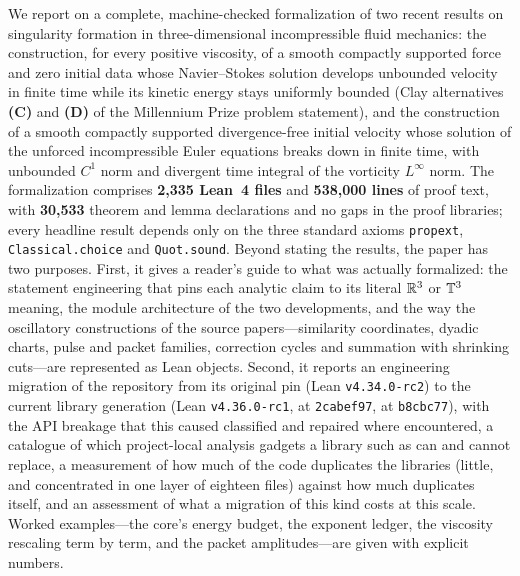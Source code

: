 We report on a complete, machine-checked formalization of two recent results on
singularity formation in three-dimensional incompressible fluid mechanics: the
construction, for every positive viscosity, of a smooth compactly supported force and
zero initial data whose Navier--Stokes solution develops unbounded velocity in finite
time while its kinetic energy stays uniformly bounded (Clay alternatives \textbf{(C)}
and \textbf{(D)} of the Millennium Prize problem statement), and the construction of a
smooth compactly supported divergence-free initial velocity whose solution of the
unforced incompressible Euler equations breaks down in finite time, with unbounded
$C^1$ norm and divergent time integral of the vorticity $L^\infty$ norm. The
formalization comprises \textbf{2{,}335 Lean~4 files} and \textbf{538{,}000 lines} of
proof text, with \textbf{30{,}533} theorem and lemma declarations and no gaps in the
proof libraries; every headline result depends only on the three standard axioms
\texttt{propext}, \texttt{Classical.choice} and \texttt{Quot.sound}. Beyond stating the
results, the paper has two purposes. First, it gives a reader's guide to what was
actually formalized: the statement engineering that pins each analytic claim to its
literal $\mathbb{R}^3$ or $\mathbb{T}^3$ meaning, the module architecture of the two developments, and
the way the oscillatory constructions of the source papers---similarity coordinates,
dyadic charts, pulse and packet families, correction cycles and summation with
shrinking cuts---are represented as Lean objects. Second, it reports an engineering
migration of the repository from its original pin (Lean \texttt{v4.34.0-rc2}) to the
current library generation (Lean \texttt{v4.36.0-rc1}, \Mathlib{} at \texttt{2cabef97},
\TauCeti{} at \texttt{b8cbc77}), with the API breakage that this caused classified and
repaired where encountered, a catalogue of which project-local analysis gadgets a
library such as \TauCeti{} can and cannot replace, a measurement of how much of the code
duplicates the libraries (little, and concentrated in one layer of eighteen files) against
how much duplicates itself, and an assessment of what a migration of this kind costs at this
scale. Worked examples---the core's energy budget, the exponent ledger, the viscosity
rescaling term by term, and the packet amplitudes---are given with explicit numbers.
